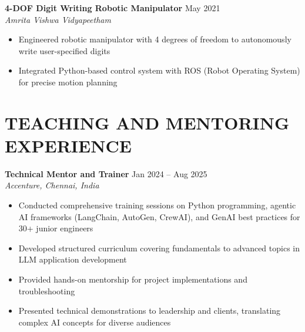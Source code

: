 \documentclass[11pt,a4paper]{article}
\newcommand{\CVItem}[1]{\item{#1}}
\newcommand{\CVSubheading}[4]{
  \vspace{2pt}
  \textbf{#1} \hfill #2 \\
  \textit{#3} \hfill \textit{#4}
  \vspace{3pt}
}
\begin{document}
\CVSubheading
{4-DOF Digit Writing Robotic Manipulator}
{May 2021}
{Amrita Vishwa Vidyapeetham}
{}
\begin{itemize}
    \CVItem{Engineered robotic manipulator with 4 degrees of freedom to autonomously write user-specified digits}
    \CVItem{Integrated Python-based control system with ROS (Robot Operating System) for precise motion planning}
\end{itemize}

\section{TEACHING AND MENTORING EXPERIENCE}

\CVSubheading
{Technical Mentor and Trainer}
{Jan 2024 -- Aug 2025}
{Accenture, Chennai, India}
{}
\begin{itemize}
    \CVItem{Conducted comprehensive training sessions on Python programming, agentic AI frameworks (LangChain, AutoGen, CrewAI), and GenAI best practices for 30+ junior engineers}
    \CVItem{Developed structured curriculum covering fundamentals to advanced topics in LLM application development}
    \CVItem{Provided hands-on mentorship for project implementations and troubleshooting}
    \CVItem{Presented technical demonstrations to leadership and clients, translating complex AI concepts for diverse audiences}
\end{itemize}





\end{document}
